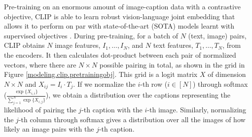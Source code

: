 Pre-training on an enormous amount of image-caption data with a contrastive objective, CLIP is able to learn robust vision-language joint embedding that allows it to perform on par with state-of-the-art (SOTA) models learnt with supervised objectives \citep{CLIPpaper}.  
During pre-training, for a batch of $N$ (text, image) pairs, CLIP obtains $N$ image features, $I_1,\dots,I_N$, and $N$ text features, $T_1,\dots,T_N$, from the encoders. 
It then calculates dot-product between each pair of normalized vectors, where there are $N \times N$ possible pairing in total, as shown in the grid in Figure \ref{modeling.clip.pretrainingobj}.
This grid is a logit matrix $X$ of dimension $N\times N$ and $X_{ij} = I_i \cdot T_j$. 
If we normalize the $i$-th row ($i \in [N]$) through softmax ($\frac{\exp\{ {X}_{i,i} \}}{ \sum_{j=1}^N \exp\{ {X}_{i,j}\}}$), we obtain a distribution over the captions representing the likelihood of pairing the $j$-th caption with the $i$-th image. 
Similarly, normalizing the $j$-th column through softmax gives a distribution over all the images of how likely an image pairs with the $j$-th caption. 

